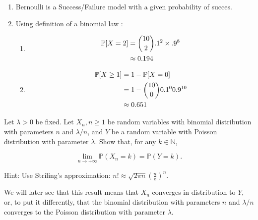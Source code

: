 \begin{solution}
  \begin{enumerate}
    \item Bernoulli is a Success/Failure model with a given probability of succes.
    \item Using definition of a binomial law :
          \begin{enumerate}
            \item \begin{align*}
                    \mathbb{P}[X = 2] & = \binom{10}{2} .1^2 \times .9^8 \\
                                  & \approx 0.194
                  \end{align*}
            \item \begin{align*}
                    \mathbb{P}[X \geq 1] & = 1 - \mathbb{P}[X = 0]                \\
                                     & = 1 - \binom{10}{0} 0.1^0 0.9^{10} \\
                                     & \approx 0.651
                  \end{align*}
          \end{enumerate}
  \end{enumerate}
\end{solution}

\begin{Exercise}
  Let $\lambda>0$ be fixed. Let $X_{n}, n \geq 1$ be random variables with binomial distribution with parameters $n$ and $\lambda / n$, and $Y$ be a random variable with Poisson distribution with parameter $\lambda$. Show that, for any $k \in \mathbb{N}$,

  \[
    \lim _{n \rightarrow+\infty} \mathbb{P}\left(X_{n}=k\right)=\mathbb{P}(Y=k) .
  \]

  Hint: Use Striling's approximation: $n ! \approx \sqrt{2 \pi n}{\left(\frac{n}{\mathrm{e}}\right)}^{n}$.

  We will later see that this result means that $X_{n}$ converges in distribution to $Y$, or, to put it differently, that the binomial distribution with parameters $n$ and $\lambda / n$ converges to the Poisson distribution with parameter $\lambda$.
\end{Exercise}

